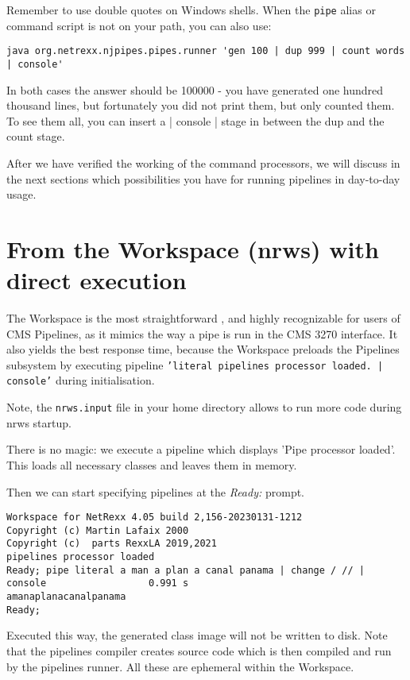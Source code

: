 Remember to use double quotes on Windows shells. When the \texttt{pipe}
alias or command script is not on your path, you can also use:

\begin{lstlisting}
java org.netrexx.njpipes.pipes.runner 'gen 100 | dup 999 | count words | console'
\end{lstlisting}

In both cases the answer should be 100000 - you have generated one
hundred thousand lines, but fortunately you did not print them, but
only counted them. To see them all, you can insert a | console | stage
in between the dup and the count stage.

After we have verified the working of the command processors, we will
discuss in the next sections which possibilities you have for running
pipelines in day-to-day usage.



\section{From the \nr{} Workspace (nrws) with direct execution}\label{nrws}
The \nr{} Workspace is the most straightforward , and highly recognizable for
users of CMS Pipelines, as it mimics the way a pipe is run in the CMS
3270 interface. It also yields the best response time, because the \nr{} Workspace preloads the Pipelines subsystem by
executing pipeline \texttt{'literal pipelines processor loaded. | console'} during initialisation.

Note, the \texttt{nrws.input} file in your home directory allows to run more code during nrws startup.

There is no magic: we execute a pipeline which displays 'Pipe
processor loaded'. This loads all necessary classes and leaves them
in memory.

Then we can start specifying pipelines at the \emph{Ready:} prompt.

\begin{lstlisting}
Workspace for NetRexx 4.05 build 2,156-20230131-1212
Copyright (c) Martin Lafaix 2000
Copyright (c)  parts RexxLA 2019,2021
pipelines processor loaded
Ready; pipe literal a man a plan a canal panama | change / // | console                  0.991 s
amanaplanacanalpanama
Ready;
\end{lstlisting}
Executed this way, the generated class image will not be written to
disk. Note that the pipelines compiler creates \nr{} source code which is then compiled and run by the pipelines runner.
All these are ephemeral within the \nr{} Workspace.

